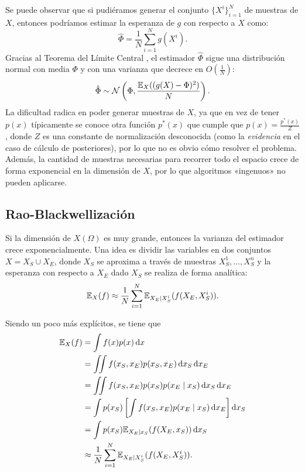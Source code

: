 Se puede observar que si pudiéramos generar el conjunto \(\{X^i\}_{i=1}^N\) de muestras de \(X\), entonces podríamos estimar la esperanza de \(g\) con respecto a \(X\) como:
\begin{equation*}
\hat{\Phi}=\frac{1}{N} \sum_{i=1}^N g(X^i).
\end{equation*}
Gracias al Teorema del Límite Central , el estimador \(\hat{\Phi}\) sigue una distribución normal con media \(\Phi\) y con una varianza que decrece en \(O(\frac{1}{N})\):
\begin{equation*}
\hat{\Phi}\sim \mathcal{N}\left(\Phi, \frac{\mathbb{E}_{X}((g(X) - \Phi)^2)}{N}\right).
\end{equation*}
La dificultad radica en poder generar muestras de \(X\), ya que en vez de tener \(p(x)\) típicamente se conoce otra función \(p^{\ast}(x)\) que cumple que \(p(x) = \frac{p^{\ast}(x)}{Z}\), donde \(Z\) es una constante de normalización desconocida (como la \emph{evidencia} en el caso de cálculo de posteriores), por lo que no es obvio cómo resolver el problema. Además, la cantidad de muestras necesarias para recorrer todo el espacio crece de forma exponencial en la dimensión de \(X\), por lo que algoritmos «ingenuos» no pueden aplicarse.

\subsection{Rao-Blackwellización}
Si la dimensión de \(X(\Omega)\) es muy grande, entonces la varianza del estimador crece exponencialmente. Una idea es dividir las variables en dos conjuntos \(X = X_S \cup X_E\), donde \(X_S\) se aproxima a través de muestras \(X_S^1, \dotsc, X_S^n\) y la esperanza con respecto a \(X_E\) dado \(X_S\) se realiza de forma analítica:
\begin{equation*}
\mathbb{E}_{X}(f) \approx \frac{1}{N} \sum_{i=1}^N \mathbb{E}_{X_E \mid X_S^i}(f(X_E, X_S^i)).
\end{equation*}

Siendo un poco más explícitos, se tiene que
\begin{align*}
\mathbb{E}_{X}(f)	&= \int f(x) p(x) \dd{x}\\
&= \iint f(x_S, x_E) p(x_S, x_E) \dd{x_S} \dd{x_E}\\
&= \iint f(x_S, x_E) p(x_S) p(x_E \mid x_S) \dd{x_S} \dd{x_E}\\
&= \int p(x_S) \left[\int f(x_S, x_E) p(x_E \mid x_S) \dd{x_E}\right] \dd{x_S}\\
&= \int p(x_S) \mathbb{E}_{X_E \mid x_S} (f(X_E, x_S)) \dd{x_S}\\
&\approx \frac{1}{N}\sum_{i=1}^N \mathbb{E}_{X_E \mid X_S^i} (f(X_{E},X_{S}^{i})).
\end{align*}

